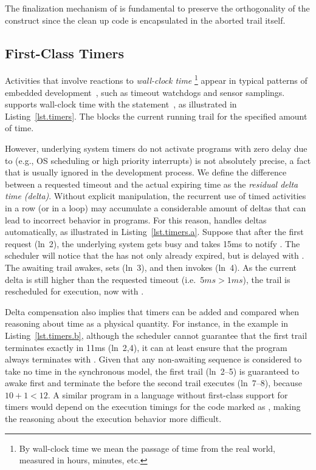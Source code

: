 The finalization mechanism of \CEU is fundamental to preserve the orthogonality
of the  construct since the clean up code is encapsulated in the
aborted trail itself.

\subsection{ First-Class Timers }
\label{sec.ceu.timers}

Activities that involve reactions to \emph{wall-clock time}%
\footnote{
By wall-clock time we mean the passage of time from the real world, measured in 
hours, minutes, etc.
}
appear in typical patterns of embedded development~\cite{esterel.delays}, such
as timeout watchdogs and sensor samplings.
%
\CEU supports wall-clock time with the 
statement~\cite{ceu.tecs17}, as illustrated in Listing~\ref{lst.timers}.
The  blocks the current running trail for the specified amount of
time.

However, underlying system timers do not activate programs with zero delay
due to
 (e.g., OS scheduling or high priority interrupts)
is not absolutely
precise, a fact that is usually ignored in the development process.
We define the difference between a requested timeout and the actual expiring 
time as the \emph{residual delta time (delta)}.
Without explicit manipulation, the recurrent use of timed activities in a row 
(or in a loop) may accumulate a considerable amount of deltas that can lead to 
incorrect behavior in programs.
%
For this reason, \CEU handles deltas automatically, as illustrated in
Listing~\ref{lst.timers.a}.
Suppose that after the first  request (ln~2), the underlying
system gets busy and takes 15ms to notify \CEU.
%
The scheduler will notice that the  has not only already expired,
but is delayed with .
The awaiting trail awakes, sets  (ln~3), and then invokes
 (ln~4).
As the current delta is still higher than the requested timeout
(i.e.~$5ms>1ms$), the trail is rescheduled for execution, now with
.

Delta compensation also implies that timers can be added and compared when
reasoning about time as a physical quantity.
For instance, in the example in Listing~\ref{lst.timers.b}, although the 
scheduler cannot guarantee that the first trail terminates exactly in 11ms
(ln~2,4), it can at least ensure that the program always terminates with 
.
%
Given that any non-awaiting sequence is considered to take no time in the 
synchronous model, the first trail (ln~2--5) is guaranteed to awake first and
terminate the  before the second trail executes (ln~7--8),
because $10+1 < 12$.
%
A similar program in a language without first-class support for timers would 
depend on the execution timings for the code marked as , making the 
reasoning about the execution behavior more difficult.

